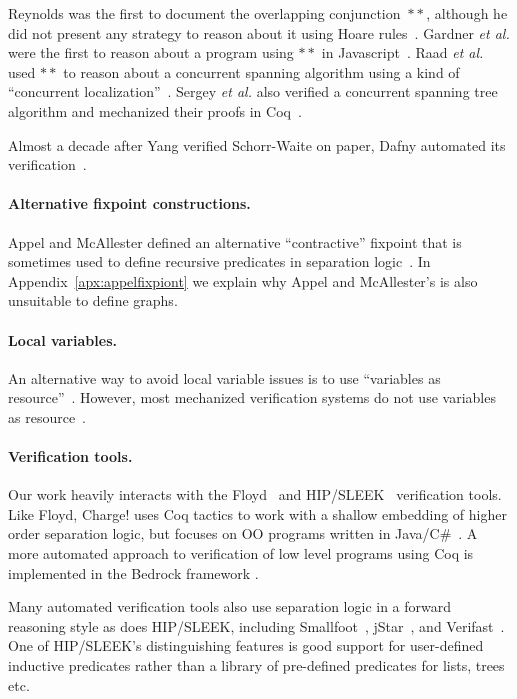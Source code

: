Reynolds was the first to document the overlapping conjunction~$**$, although he did not present any strategy to reason about it using Hoare rules~\cite{rey-slnotes}.  Gardner \emph{et al.} were the first to reason about a program using $**$ in Javascript~\cite{GardnerMS12}.  Raad \emph{et al.} used $**$ to reason about a concurrent spanning algorithm using a kind of ``concurrent localization''~\cite{RaadVG15}.  Sergey \emph{et al.} also verified a concurrent spanning tree algorithm and mechanized their proofs in Coq~\cite{ilya-graphs}.

Almost a decade after Yang verified Schorr-Waite on paper, Dafny automated its verification~\cite{Leino10}.

\paragraph{Alternative fixpoint constructions.} 
Appel and McAllester defined an alternative ``contractive'' fixpoint that is sometimes used to define recursive predicates in separation
logic~\cite{appel:fixpoint}.  In Appendix~\ref{apx:appelfixpiont} we explain why Appel and McAllester's  is also unsuitable to define graphs.

\paragraph{Local variables.}
An alternative way to avoid local variable issues is to use ``variables as resource''~\cite{bornat:var}.
However, most mechanized verification systems do not use variables as resource~\cite{Beckert:2007,DistefanoP08,chin:hipsleek,Leino10,bengtson:charge,appel:programlogics}.

\paragraph{Verification tools.}
Our work heavily interacts with the Floyd~\cite{appel:programlogics} and HIP/SLEEK~\cite{chin:hipsleek} verification tools.  Like Floyd, Charge! uses Coq tactics to work with a shallow embedding of higher order separation logic, but focuses on OO programs written in Java/C\#~\cite{bengtson:charge}.  A  more automated approach to verification of low level programs using Coq is implemented in the Bedrock framework \cite{chlipala:bedrock}.

Many automated verification tools also use separation logic in a forward reasoning style as does HIP/SLEEK, including Smallfoot~\cite{berdine:smallfoot}, jStar~\cite{DistefanoP08}, and Verifast~\cite{jacobs:verifast}.  One of HIP/SLEEK's distinguishing features is good support for user-defined inductive predicates rather than a library of pre-defined predicates for lists, trees etc.

